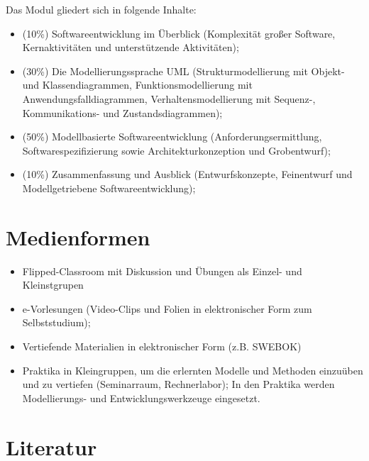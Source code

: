 Das Modul gliedert sich in folgende Inhalte:

\begin{itemize}
\tightlist
\item
  (10\%) Softwareentwicklung im Überblick (Komplexität großer Software,
  Kernaktivitäten und unterstützende Aktivitäten);
\item
  (30\%) Die Modellierungssprache UML (Strukturmodellierung mit Objekt-
  und Klassendiagrammen, Funktionsmodellierung mit
  Anwendungsfalldiagrammen, Verhaltensmodellierung mit Sequenz-,
  Kommunikations- und Zustandsdiagrammen);
\item
  (50\%) Modellbasierte Softwareentwicklung (Anforderungsermittlung,
  Softwarespezifizierung sowie Architekturkonzeption und Grobentwurf);
\item
  (10\%) Zusammenfassung und Ausblick (Entwurfskonzepte, Feinentwurf und
  Modellgetriebene Softwareentwicklung);
\end{itemize}

\hypertarget{medienformenpathlabel....srcmodulbeschreibungen-bachelor-bpo5ba_entwicklung-von-system-architekturen}{%
\section*{Medienformen\label{../../src/modulbeschreibungen-bachelor-bpo5/BA_Entwicklung-von-System-Architekturen}}\label{medienformenpathlabel....srcmodulbeschreibungen-bachelor-bpo5ba_entwicklung-von-system-architekturen}}

\begin{itemize}
\tightlist
\item
  Flipped-Classroom mit Diskussion und Übungen als Einzel- und
  Kleinstgrupen
\item
  e-Vorlesungen (Video-Clips und Folien in elektronischer Form zum
  Selbststudium);
\item
  Vertiefende Materialien in elektronischer Form (z.B. SWEBOK)
\item
  Praktika in Kleingruppen, um die erlernten Modelle und Methoden
  einzuüben und zu vertiefen (Seminarraum, Rechnerlabor); In den
  Praktika werden Modellierungs- und Entwicklungswerkzeuge eingesetzt.
\end{itemize}

\hypertarget{literaturpathlabel....srcmodulbeschreibungen-bachelor-bpo5ba_entwicklung-von-system-architekturen}{%
\section*{Literatur\label{../../src/modulbeschreibungen-bachelor-bpo5/BA_Entwicklung-von-System-Architekturen}}\label{literaturpathlabel....srcmodulbeschreibungen-bachelor-bpo5ba_entwicklung-von-system-architekturen}}

